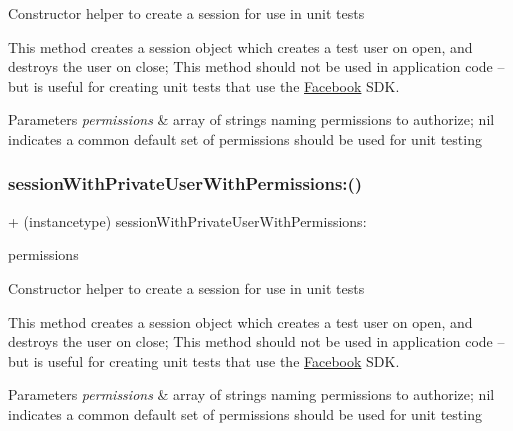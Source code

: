 Constructor helper to create a session for use in unit tests

This method creates a session object which creates a test user on open, and destroys the user on close; This method should not be used in application code -- but is useful for creating unit tests that use the \hyperlink{interfaceFacebook}{Facebook} S\+DK.


\begin{DoxyParams}{Parameters}
{\em permissions} & array of strings naming permissions to authorize; nil indicates a common default set of permissions should be used for unit testing \\
\hline
\end{DoxyParams}
\mbox{\label{interfaceFBTestSession_a435c3fc5a918dc5d0a4cfb05cf95e454}} 
\subsubsection{\texorpdfstring{session\+With\+Private\+User\+With\+Permissions\+:()}{sessionWithPrivateUserWithPermissions:()}\hspace{0.1cm}{\footnotesize\ttfamily [3/5]}}
{\footnotesize\ttfamily + (instancetype) session\+With\+Private\+User\+With\+Permissions\+: \begin{DoxyParamCaption}\item[{(N\+S\+Array $\ast$)}]{permissions }\end{DoxyParamCaption}}

Constructor helper to create a session for use in unit tests

This method creates a session object which creates a test user on open, and destroys the user on close; This method should not be used in application code -- but is useful for creating unit tests that use the \hyperlink{interfaceFacebook}{Facebook} S\+DK.


\begin{DoxyParams}{Parameters}
{\em permissions} & array of strings naming permissions to authorize; nil indicates a common default set of permissions should be used for unit testing \\
\hline
\end{DoxyParams}
\mbox{\label{interfaceFBTestSession_a435c3fc5a918dc5d0a4cfb05cf95e454}} 
